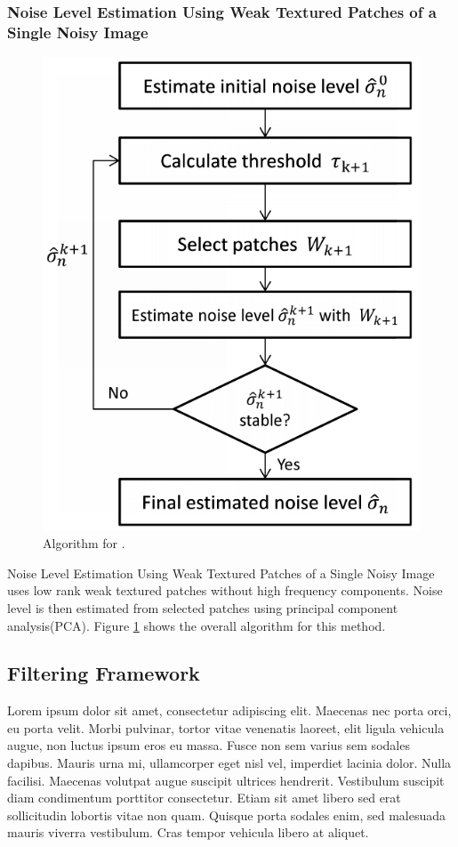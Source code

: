 \documentclass[10pt,twocolumn,letterpaper]{article}
\begin{document}
\subsubsection{Noise Level Estimation Using Weak Textured Patches of a Single Noisy Image}
\begin{figure}
	\includegraphics[width=0.9\columnwidth]{single_image_noise_estimation.png}
	\caption{Algorithm for \cite{noise-weak-texture}.}
	\label{fig:alg-weak-texture}
\end{figure}
Noise Level Estimation Using Weak Textured Patches of a Single Noisy Image\cite{noise-weak-texture} uses low rank weak textured patches without high frequency components. Noise level is then estimated from selected patches using principal component analysis(PCA). Figure \ref{fig:alg-weak-texture} shows the overall algorithm for this method.

\subsection{Filtering Framework}
Lorem ipsum dolor sit amet, consectetur adipiscing elit. Maecenas nec porta orci, eu porta velit. Morbi pulvinar, tortor vitae venenatis laoreet, elit ligula vehicula augue, non luctus ipsum eros eu massa. Fusce non sem varius sem sodales dapibus. Mauris urna mi, ullamcorper eget nisl vel, imperdiet lacinia dolor. Nulla facilisi. Maecenas volutpat augue suscipit ultrices hendrerit. Vestibulum suscipit diam condimentum porttitor consectetur. Etiam sit amet libero sed erat sollicitudin lobortis vitae non quam. Quisque porta sodales enim, sed malesuada mauris viverra vestibulum. Cras tempor vehicula libero at aliquet.
\end{document}
